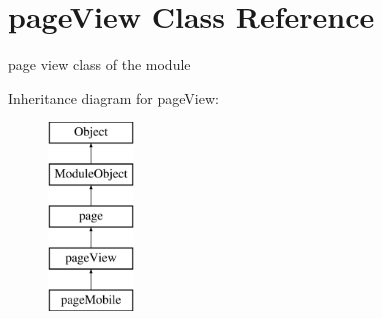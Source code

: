 \hypertarget{classpageView}{}\section{page\+View Class Reference}
\label{classpageView}


page view class of the module  


Inheritance diagram for page\+View\+:\begin{figure}[H]
\begin{center}
\leavevmode
\includegraphics[height=5.000000cm]{classpageView}
\end{center}
\end{figure}
